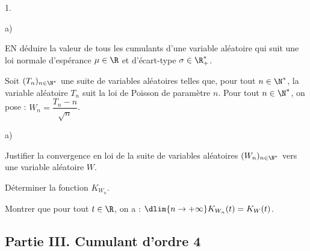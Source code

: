 \documentclass[11pt]{article}%
\begin{document}
\begin{noliste}{1.}
\begin{noliste}{a)}
  \item EN déduire la valeur de tous les cumulants d'une variable
    aléatoire qui suit une loi normale d'espérance $\mu \in \R$ et
    d'écart-type $\sigma \in \R_+^*$.
  \end{noliste}
  
\item Soit $(T_n)_{n \in \N^*}$ une suite de variables aléatoires
  telles que, pour tout $n \in \N^*$, la variable aléatoire $T_n$ suit
  la loi de Poisson de paramètre $n$. Pour tout $n \in \N^*$, on pose
  : $W_n = \dfrac{T_n - n}{\sqrt{n}}$.
  \begin{noliste}{a)}
    \setlength{\itemsep}{2mm}
  \item Justifier la convergence en loi de la suite de variables
    aléatoires $(W_n)_{n \in \N^*}$ vers une variable aléatoire $W$.
    
  \item Déterminer la fonction $K_{W_n}$.
    
  \item Montrer que pour tout $t \in \R$, on a : $\dlim{n\to +\infty}
    K_{W_n}(t) = K_W(t)$.
  \end{noliste}
\end{noliste}


\subsection*{Partie III. Cumulant d'ordre 4}
\end{document}
